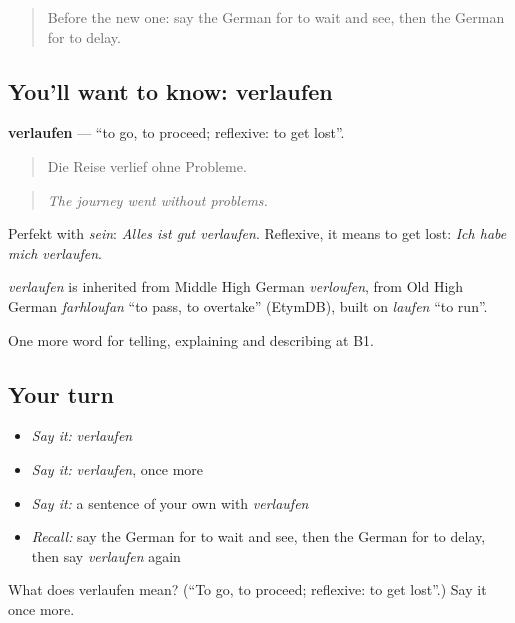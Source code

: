 \begin{quote}
Before the new one: say the German for to wait and see, then the German for to delay.
\end{quote}

\subsection*{You'll want to know: verlaufen}
\textbf{verlaufen} — \textquotedblleft{}to go, to proceed; reflexive: to get lost\textquotedblright{}.

\begin{quote}
Die Reise verlief ohne Probleme.
\end{quote}

\begin{quote}
\emph{The journey went without problems.}
\end{quote}

Perfekt with \emph{sein}: \emph{Alles ist gut verlaufen}. Reflexive, it means to get lost: \emph{Ich habe mich verlaufen}.

\begin{cousinweb}
\emph{verlaufen} is inherited from Middle High German \emph{verloufen}, from Old High German \emph{farhloufan} \textquotedblleft{}to pass, to overtake\textquotedblright{} (EtymDB), built on \emph{laufen} \textquotedblleft{}to run\textquotedblright{}.
\end{cousinweb}

\begin{grammarlens}[title={What you've built}]
One more word for telling, explaining and describing at B1.
\end{grammarlens}

\subsection*{Your turn}
\begin{itemize}
\raggedright
  \item \emph{Say it:} \emph{verlaufen}
  \item \emph{Say it:} \emph{verlaufen}, once more
  \item \emph{Say it:} a sentence of your own with \emph{verlaufen}
  \item \emph{Recall:} say the German for to wait and see, then the German for to delay, then say \emph{verlaufen} again
\end{itemize}

\begin{tcolorbox}[breakable,colback=teal!4,colframe=teal!35!black,title={Before you move on}]
What does verlaufen mean? (\textquotedblleft{}To go, to proceed; reflexive: to get lost\textquotedblright{}.) Say it once more.
\end{tcolorbox}
